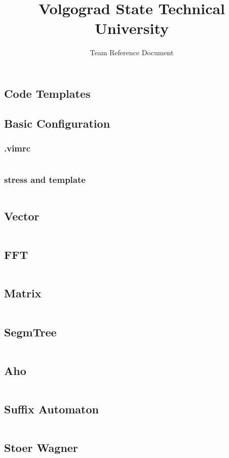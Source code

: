 \documentclass[11.5pt,a4paper,landscape,oneside]{amsart}
\title{Volgograd State Technical University}
\subtitle{Team Reference Document}
\date{\ddmmyyyydate{\today{}}}
\newcommand{\bashcode}[1]{\inputminted{bash}{code/#1}}
\newcommand{\regcode}[1]{\inputminted[xleftmargin=2em,linenos]{cpp}{code/#1}}
\begin{document}
\begin{multicols*}{2}
\maketitle
\thispagestyle{fancy}
\vspace{-3em}

\tableofcontents
\clearpage

\section{Code Templates}
	\subsection{Basic Configuration}
		\subsubsection{.vimrc}
			\bashcode{vimrc.sh}
		\subsubsection{stress and template}
			\regcode{main.cpp}
	\subsection{Vector}
		\regcode{vec.cpp}
	\subsection{FFT}
		\regcode{fft.cpp}
	\subsection{Matrix}
		\regcode{matrix.cpp}
	\subsection{SegmTree}
		\regcode{segm_tree.cpp}
	\subsection{Aho}
		\regcode{aho.cpp}
	\subsection{Suffix Automaton}
		\regcode{suf_auto.cpp}
	\subsection{Stoer Wagner}
		\regcode{stoer_wagner_mincut.cpp}

\end{multicols*}
\end{document}
